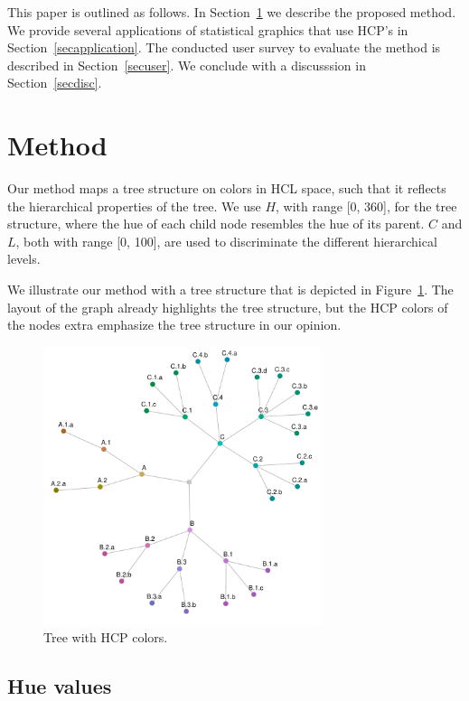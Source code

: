 \documentclass[journal]{vgtc}                %
\begin{document}
This paper is outlined as follows. In Section~\ref{secmethod} we describe the proposed method. We provide several applications of statistical graphics that use HCP's in Section~\ref{secapplication}. The conducted user survey to evaluate the method is described in Section~\ref{secuser}. We conclude with a discusssion in Section~\ref{secdisc}.

\section{Method}\label{secmethod}
Our method maps a tree structure on colors in HCL space, such that it reflects the hierarchical properties of the tree. We use $H$, with range [0, 360], for the tree structure, where the hue of each child node resembles the hue of its parent. $C$ and $L$, both with range [0, 100], are used to discriminate the different hierarchical levels.

We illustrate our method with a tree structure that is depicted in Figure~\ref{fig:graph}. The layout of the graph already highlights the tree structure, but the HCP colors of the nodes extra emphasize the tree structure in our opinion.

\begin{figure}[htb]
  \vspace{-3ex}
  \centering
  \includegraphics[width=3.2in]{HCPgraph.pdf}
  \vspace{-5ex}
  \caption{Tree with HCP colors.}\label{fig:graph}
  \vspace{-2ex}
\end{figure}

\subsection{Hue values}
\end{document}
